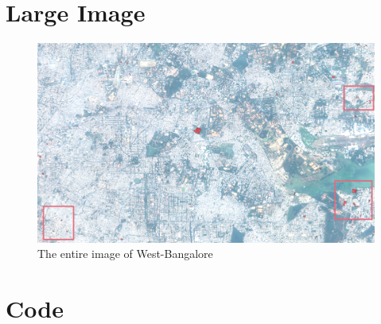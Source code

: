 \appendix
\section{Large Image}

\begin{figure}
	\includegraphics[width=\linewidth]{images/west-bangalore_sections}
	\caption{The entire image of West-Bangalore}
	\label{fig:ap_a_1}
\end{figure}

\section{Code}

